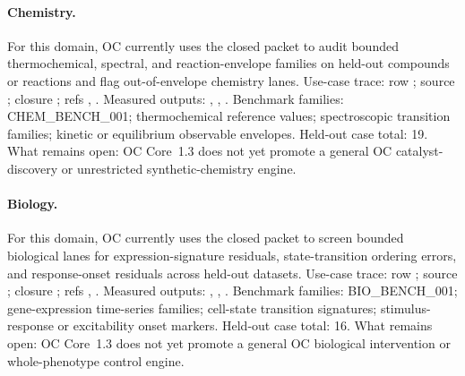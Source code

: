 \paragraph{Chemistry.}
For this domain, OC currently uses the closed packet to audit bounded thermochemical, spectral, and reaction-envelope families on held-out compounds or reactions and flag out-of-envelope chemistry lanes.
Use-case trace: row ; \allowbreak source ; \allowbreak closure ; \allowbreak refs , \allowbreak {}.
Measured outputs: , , .
Benchmark families: CHEM\_BENCH\_001; thermochemical reference values; spectroscopic transition families; kinetic or equilibrium observable envelopes.
Held-out case total: 19.
What remains open: OC Core~1.3 does not yet promote a general OC catalyst-discovery or unrestricted synthetic-chemistry engine.

\paragraph{Biology.}
For this domain, OC currently uses the closed packet to screen bounded biological lanes for expression-signature residuals, state-transition ordering errors, and response-onset residuals across held-out datasets.
Use-case trace: row ; \allowbreak source ; \allowbreak closure ; \allowbreak refs , \allowbreak {}.
Measured outputs: , , .
Benchmark families: BIO\_BENCH\_001; gene-expression time-series families; cell-state transition signatures; stimulus-response or excitability onset markers.
Held-out case total: 16.
What remains open: OC Core~1.3 does not yet promote a general OC biological intervention or whole-phenotype control engine.

